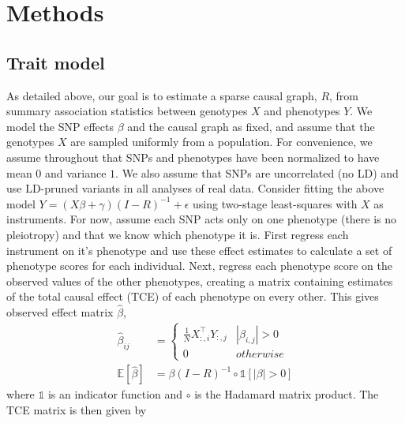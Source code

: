 \documentclass{article}
\begin{document}
\section{Methods}\label{methods}
\subsection{Trait model}
As detailed above, our goal is to estimate a sparse causal graph, $R$, from
summary association statistics between genotypes $X$ and phenotypes $Y$. We model
the SNP effects $\beta$ and the causal graph as fixed, and assume that the genotypes
$X$ are sampled uniformly from a population. For convenience, we assume throughout that SNPs
 and phenotypes have been normalized
 to have mean $0$ and variance $1$. We also assume that SNPs are uncorrelated (no LD)
and use LD-pruned variants in all analyses of real data.
Consider fitting the above model $Y = (X\beta + \gamma)(I-R)^{-1} + \epsilon$
using two-stage least-squares with $X$ as instruments. For now,
 assume each SNP acts only on one phenotype
(there is no pleiotropy) and that we know which phenotype it is.
First regress each instrument on it's phenotype and use these effect
 estimates to calculate a set of phenotype scores for each individual.
Next, regress each phenotype score on the observed values of the other phenotypes,
 creating a matrix containing estimates of the total causal effect (TCE) of
 each phenotype on every other. This gives observed effect matrix $\hat{\beta}$,
\begin{align*}
\hat{\beta}_{ij} &= \left\{
 \begin{array}{ll}
  \frac{1}{N} X_{:, i}^{\top}Y_{:,j} & |\beta_{i,j}| > 0 \\
  0 & otherwise
 \end{array} \right. \\
 \mathbb{E}[\hat{\beta} ] &= \beta (I-R)^{-1} \circ \mathds{1}[|\beta| > 0]
\end{align*}
where $\mathds{1}$ is an indicator function and $\circ$ is the Hadamard matrix
product. The TCE matrix is then given by
\end{document}

